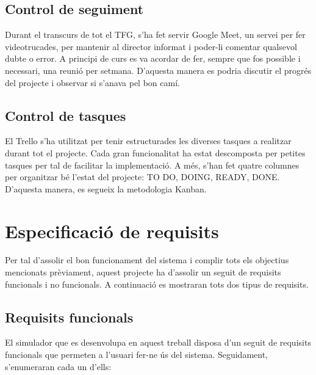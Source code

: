\documentclass[a4paper]{article}
\begin{document}
\subsection{Control de seguiment}
    
Durant el transcurs de tot el TFG, s'ha fet servir Google Meet, un servei per fer videotrucades, per mantenir al director informat i poder-li comentar qualsevol dubte o error. A principi de curs es va acordar de fer, sempre que fos possible i necessari, una reunió per setmana. D'aquesta manera es podria discutir el progrés del projecte i observar si s'anava pel bon camí.

\subsection{Control de tasques}

El Trello s'ha utilitzat per tenir estructurades les diverses tasques a realitzar durant tot el projecte. Cada gran funcionalitat ha estat descomposta per petites tasques per tal de facilitar la implementació. A més, s'han fet quatre columnes per organitzar bé l'estat del projecte: TO DO, DOING, READY, DONE. D'aquesta manera, es segueix la metodologia Kanban.

\newpage
\section{Especificació de requisits}
Per tal d'assolir el bon funcionament del sistema i complir tots els objectius mencionats prèviament, aquest projecte ha d'assolir un seguit de requisits funcionals i no funcionals. A continuació es mostraran tots dos tipus de requisits.

\subsection{Requisits funcionals}
El simulador que es desenvolupa en aquest treball disposa d'un seguit de requisits funcionals que permeten a l'usuari fer-ne ús del sistema. Seguidament, s'enumeraran cada un d'ells:
\end{document}
